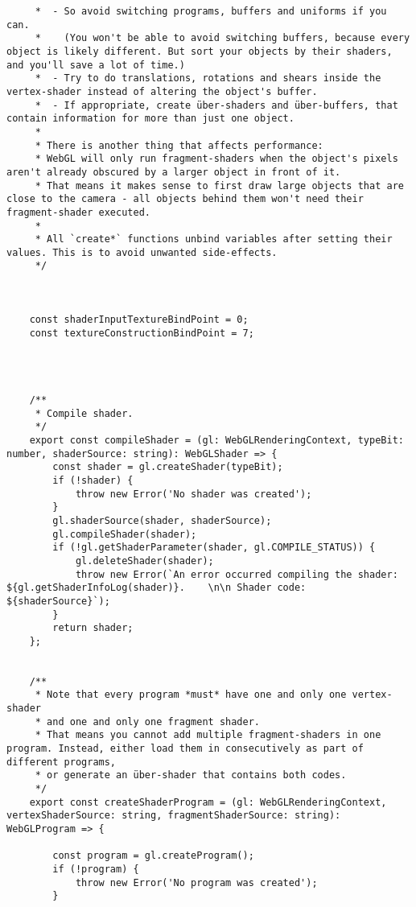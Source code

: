 \begin{lstlisting}
     *  - So avoid switching programs, buffers and uniforms if you can.
     *    (You won't be able to avoid switching buffers, because every object is likely different. But sort your objects by their shaders, and you'll save a lot of time.)
     *  - Try to do translations, rotations and shears inside the vertex-shader instead of altering the object's buffer.
     *  - If appropriate, create über-shaders and über-buffers, that contain information for more than just one object.
     *
     * There is another thing that affects performance:
     * WebGL will only run fragment-shaders when the object's pixels aren't already obscured by a larger object in front of it.
     * That means it makes sense to first draw large objects that are close to the camera - all objects behind them won't need their fragment-shader executed.
     *
     * All `create*` functions unbind variables after setting their values. This is to avoid unwanted side-effects.
     */
    
    
    
    const shaderInputTextureBindPoint = 0;
    const textureConstructionBindPoint = 7;
    
    
    
    
    /**
     * Compile shader.
     */
    export const compileShader = (gl: WebGLRenderingContext, typeBit: number, shaderSource: string): WebGLShader => {
        const shader = gl.createShader(typeBit);
        if (!shader) {
            throw new Error('No shader was created');
        }
        gl.shaderSource(shader, shaderSource);
        gl.compileShader(shader);
        if (!gl.getShaderParameter(shader, gl.COMPILE_STATUS)) {
            gl.deleteShader(shader);
            throw new Error(`An error occurred compiling the shader: ${gl.getShaderInfoLog(shader)}.    \n\n Shader code: ${shaderSource}`);
        }
        return shader;
    };
    
    
    /**
     * Note that every program *must* have one and only one vertex-shader
     * and one and only one fragment shader.
     * That means you cannot add multiple fragment-shaders in one program. Instead, either load them in consecutively as part of different programs,
     * or generate an über-shader that contains both codes.
     */
    export const createShaderProgram = (gl: WebGLRenderingContext, vertexShaderSource: string, fragmentShaderSource: string): WebGLProgram => {
    
        const program = gl.createProgram();
        if (!program) {
            throw new Error('No program was created');
        }
    

\end{lstlisting}
